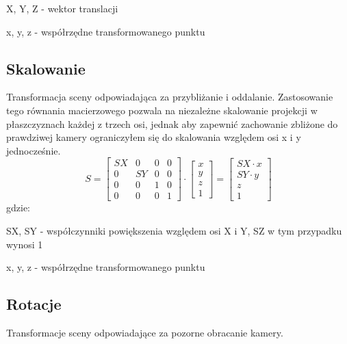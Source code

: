\documentclass[11pt]{article}
\begin{document}
X, Y, Z - wektor translacji

x, y, z - współrzędne transformowanego punktu

\subsection{Skalowanie}
Transformacja sceny odpowiadająca za przybliżanie i oddalanie. 
Zastosowanie tego równania macierzowego pozwala na niezależne skalowanie 
projekcji w płaszczyznach każdej z trzech osi, jednak aby zapewnić zachowanie zbliżone
do prawdziwej kamery ograniczyłem się do skalowania względem osi x i y jednocześnie.
\begin{equation}
    S =
    \begin{bmatrix}
        SX & 0 & 0 & 0\\
        0 & SY & 0 & 0\\
        0 & 0 & 1 & 0\\
        0 & 0 & 0 & 1
    \end{bmatrix}
    \cdot
    \begin{bmatrix}
        x\\
        y\\
        z\\
        1
    \end{bmatrix}
    =
    \begin{bmatrix}
        SX \cdot x\\
        SY \cdot y\\
        z\\
        1
    \end{bmatrix}
\end{equation}
gdzie:

SX, SY - współczynniki powiększenia względem osi X i Y, SZ w tym przypadku wynosi 1

x, y, z - współrzędne transformowanego punktu

\subsection{Rotacje}
Transformacje sceny odpowiadające za pozorne obracanie kamery.
\end{document}
